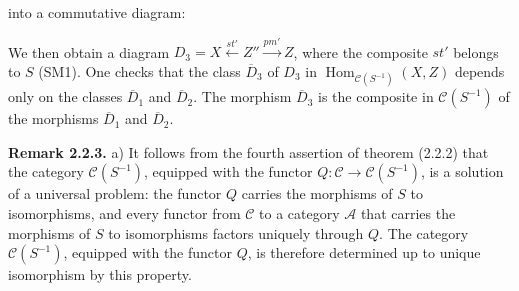\clearpage
{}%
\begingroup
\small
\setlength{\emergencystretch}{1.5em}%
\setlength{\abovedisplayskip}{1pt plus 1pt minus 1pt}%
\setlength{\belowdisplayskip}{1pt plus 1pt minus 1pt}%

\noindent into a commutative diagram:

\begin{center}
\end{center}

\noindent We then obtain a diagram
$D_3=X\xleftarrow{st'}Z''\xrightarrow{pm'}Z$, where the composite $st'$
belongs to $S$ (SM1).
%
One checks that the class $\overline D_3$ of $D_3$ in
$\operatorname{Hom}_{\mathcal C(S^{-1})}(X,Z)$ depends only on the classes
$\overline D_1$ and $\overline D_2$.
%
The morphism $\overline D_3$ is the
composite in $\mathcal C(S^{-1})$ of the morphisms $\overline D_1$ and
$\overline D_2$.

\smallskip
\noindent\textbf{Remark 2.2.3.}
%
a) It follows from the fourth assertion of theorem (2.2.2) that the category
$\mathcal C(S^{-1})$, equipped with the functor
$Q\colon\mathcal C\longrightarrow\mathcal C(S^{-1})$, is a solution of a
universal problem:
%
the functor $Q$ carries the morphisms of $S$ to isomorphisms, and every
functor from $\mathcal C$ to a category $\mathcal A$ that carries the
morphisms of $S$ to isomorphisms factors uniquely through $Q$.
%
The category $\mathcal C(S^{-1})$, equipped with the functor $Q$, is
therefore determined up to unique isomorphism by this property.


